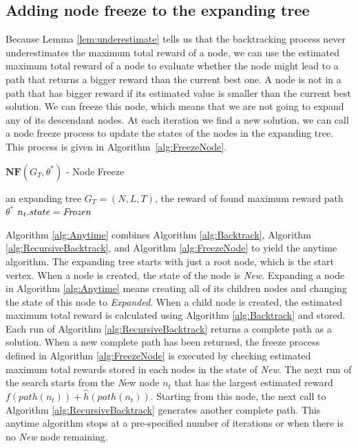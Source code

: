 \subsection{Adding node freeze to the expanding tree}
\label{sec:node_freeze}

Because Lemma \ref{lem:underestimate} tells us that the backtracking process never underestimates the maximum total reward of a node, we can use the estimated maximum total reward of a node to evaluate whether the node might lead to a path that returns a bigger reward than the current best one.
A node is not in a path that has bigger reward if its estimated value is smaller than the current best solution.
We can freeze this node, which means that we are not going to expand any of its descendant nodes.
At each iteration we find a new solution, we can call a node freeze process to update the states of the nodes in the expanding tree.
This process is given in Algorithm~\ref{alg:FreezeNode}.

\begin{algorithm}
\caption{ $ \mathbf{NF}( G_{T}, \theta^{*} ) $ - Node Freeze}
\label{alg:FreezeNode}
\begin{algorithmic}[1]
\REQUIRE 
an expanding tree $ G_{T} = (N, L, T) $, the reward of found maximum reward path $ \theta^{*} $
\STATE $ n_{t}.state = \mbox{\emph{Frozen}} $
\ENDIF
\ENDFOR
\end{algorithmic}
\end{algorithm}

Algorithm \ref{alg:Anytime} combines Algorithm \ref{alg:Backtrack}, Algorithm \ref{alg:RecursiveBacktrack}, and Algorithm \ref{alg:FreezeNode} to yield the anytime algorithm.
The expanding tree starts with just a root node, which is the start vertex.
When a node is created, the state of the node is \emph{New}.
Expanding a node in Algorithm \ref{alg:Anytime} means creating all of its children nodes and changing the state of this node to \emph{Expanded}.
When a child node is created, the estimated maximum total reward is calculated using Algorithm \ref{alg:Backtrack} and stored.
Each run of Algorithm \ref{alg:RecursiveBacktrack} returns a complete path as a solution.
When a new complete path has been returned, the freeze process defined in Algorithm \ref{alg:FreezeNode} is executed by checking estimated maximum total rewards stored in each nodes in the state of \emph{New}.
The next run of the search starts from the {\emph New} node  $ n_{t} $ that has the largest estimated reward $  f(path(n_{t})) + \hat{h}(path(n_{t})) $.
Starting from this node, the next call to Algorithm \ref{alg:RecursiveBacktrack} generates another complete path.
This anytime algorithm stops at a pre-specified number of iterations or when there is no {\em New} node remaining. 

